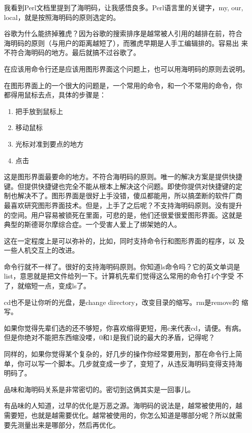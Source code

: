 \documentclass[10pt]{article}
\begin{document}
\begin{CJK*}{UTF8}{simsun}
我看到Perl文档里提到了海明码，让我感悟良多。Perl语言里的关键字，my,
our, local，就是按照海明码的原则选定的。

谷歌为什么能挤掉雅虎？因为谷歌的搜索排序是越常被人引用的越排在前，符合
海明码的原则（与用户的距离越短了），而雅虎早期是人手工编辑排的。容易出
来不符合海明码的地方。最后就搞不过谷歌了。

在应该用命令行还是应该用图形界面这个问题上，也可以用海明码的原则去说明。

在图形界面上的一个很大的问题是，一个常用的命令，和一个不常用的命令，你
都得用鼠标去点，具体的步骤是：

\begin{enumerate}
\item 把手放到鼠标上
\item 移动鼠标
\item 光标对准到要点的地方
\item 点击
\end{enumerate}

这是图形界面最要命的地方。不符合海明码的原则。唯一的解决方案是提供快捷
键。但提供快捷键也完全不能从根本上解决这个问题。即使你提供对快捷键的定
制也解决不了。图形界面是很好上手没错，傻瓜都能用，所以搞垄断的软件厂商
最喜欢研究图形界面技术。但是，上手了之后呢？不支持海明码原则。没有提升
的空间。用户容易被锁死在里面，可悲的是，他们还很爱很爱图形界面。这就是
典型的斯德哥尔摩综合症。一个受害人爱上了绑架她的人。

这在一定程度上是可以弥补的，比如，同时支持命令行和图形界面的程序，以
及一些人机交互上的改进。

命令行就不一样了。很好的支持海明码原则。你知道ls命令吗？它的英文单词是
list，意思就是把文件给列一下。计算机先辈们觉得这么常用的命令打4个字受
不了，就缩短一点，变成ls了。

cd也不是让你听的光盘，是change directory，改变目录的缩写。rm是remove的
缩写。

如果你觉得先辈们选的还不够短，你喜欢缩得更短，用c来代表cd，请便。有病。
但是你绝对不能把东西缩没喽，0和1是我们说的最大的矛盾，记得呢？

同样的，如果你觉得某个复杂的，好几步的操作你经常要用到，那在命令行上简
单，你可以写一个脚本。几步就变成一步了，变短了，从违反海明码变得支持海
明码了。

品味和海明码关系是非常密切的。密切到这俩其实是一回事儿。

有品味的人知道，过早的优化是万恶之源。海明码的说法是，越常被使用的，越
需要短，也就是越需要优化。越常被使用的，你怎么知道是哪部分呢？所以就需
要先测量出来是哪部分，然后再优化。


\end{CJK*}
\end{document}
